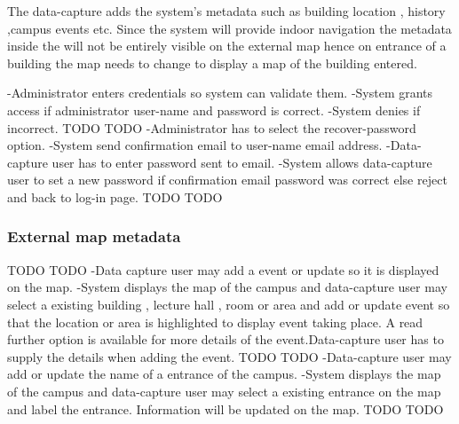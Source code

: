 The data-capture adds the system's metadata such as building location , history ,campus events etc.
Since the system will provide indoor navigation the metadata inside the will not be entirely visible on the external map hence on entrance of a building the map needs to change to display a map of the building entered.

	  	{-Administrator enters credentials so system can validate them.
	 	-System grants access if administrator user-name and password is correct.
	 	-System denies if incorrect.}
                  {TODO}
                  {TODO}
		{-Administrator has to select the recover-password option.
		-System send confirmation email to user-name email address.
		-Data-capture user has to enter password sent to email.
	  	-System allows data-capture user to set a new password if confirmation email password was correct else reject and back                    to log-in page.}
                {TODO}
                {TODO}               
\subsubsection {External map  metadata }
          {TODO}
          {TODO}
        {-Data capture user may add a event or update so it is displayed on the map.
        -System displays the map of the campus and data-capture user may select a existing building , lecture hall , room or area and            add or update event so that the location or area is highlighted to display event taking place. A read further option is                  available for more details of the event.Data-capture user has to supply the details when adding the event.}
        {TODO}
        {TODO}
         {-Data-capture user may add or update the name of a entrance of the campus.}
         {-System displays the map of the campus and data-capture user may select a existing entrance on the map and label the entrance.
         Information will be updated on the map.}
         {TODO}
         {TODO}
